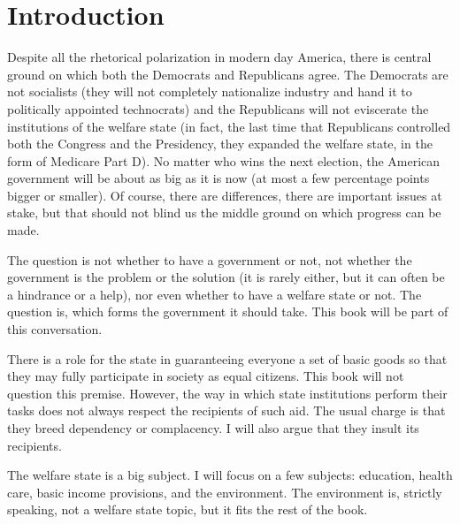 \chapter{Introduction}

Despite all the rhetorical polarization in modern day America, there is central
ground on which both the Democrats and Republicans agree. The Democrats are not
socialists (they will not completely nationalize industry and hand it to
politically appointed technocrats) and the Republicans will not eviscerate the
institutions of the welfare state (in fact, the last time that Republicans
controlled both the Congress and the Presidency, they expanded the welfare
state, in the form of Medicare Part D). No matter who wins the next election,
the American government will be about as big as it is now (at most a few
percentage points bigger or smaller). Of course, there are differences, there
are important issues at stake, but that should not blind us the middle ground
on which progress can be made.

The question is not whether to have a government or not, not whether the
government is the problem or the solution (it is rarely either, but it can
often be a hindrance or a help), nor even whether to have a welfare state or
not. The question is, which forms the government it should take. This book will
be part of this conversation.

There is a role for the state in guaranteeing everyone a set of basic goods so
that they may fully participate in society as equal citizens. This book will
not question this premise. However, the way in which state institutions perform
their tasks does not always respect the recipients of such aid. The usual
charge is that they breed dependency or complacency. I will also argue that
they insult its recipients.

\bigskip
\bigskip

The welfare state is a big subject. I will focus on a few subjects: education,
health care, basic income provisions, and the environment. The environment is, strictly
speaking, not a welfare state topic, but it fits the rest of the book.

